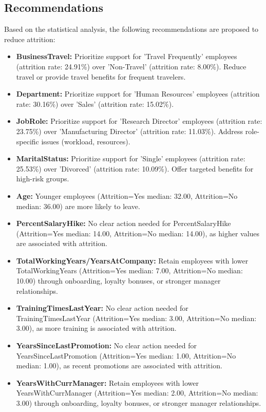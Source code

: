 \documentclass[12pt, a4paper]{article}
\begin{document}
\subsection{Recommendations}
Based on the statistical analysis, the following recommendations are proposed to reduce attrition:
\begin{itemize}
    \item \textbf{BusinessTravel:} Prioritize support for 'Travel Frequently' employees (attrition rate: 24.91\%) over 'Non-Travel' (attrition rate: 8.00\%). Reduce travel or provide travel benefits for frequent travelers.
    \item \textbf{Department:} Prioritize support for 'Human Resources' employees (attrition rate: 30.16\%) over 'Sales' (attrition rate: 15.02\%).
    \item \textbf{JobRole:} Prioritize support for 'Research Director' employees (attrition rate: 23.75\%) over 'Manufacturing Director' (attrition rate: 11.03\%). Address role-specific issues (workload, resources).
    \item \textbf{MaritalStatus:} Prioritize support for 'Single' employees (attrition rate: 25.53\%) over 'Divorced' (attrition rate: 10.09\%). Offer targeted benefits for high-risk groups.
    \item \textbf{Age:} Younger employees (Attrition=Yes median: 32.00, Attrition=No median: 36.00) are more likely to leave. 
    \item \textbf{PercentSalaryHike:} No clear action needed for PercentSalaryHike (Attrition=Yes median: 14.00, Attrition=No median: 14.00), as higher values are associated with attrition.
    \item \textbf{TotalWorkingYears/YearsAtCompany:} Retain employees with lower TotalWorkingYears (Attrition=Yes median: 7.00, Attrition=No median: 10.00) through onboarding, loyalty bonuses, or stronger manager relationships.
    \item \textbf{TrainingTimesLastYear:} No clear action needed for TrainingTimesLastYear (Attrition=Yes median: 3.00, Attrition=No median: 3.00), as more training is associated with attrition.
    \item \textbf{YearsSinceLastPromotion:} No clear action needed for YearsSinceLastPromotion (Attrition=Yes median: 1.00, Attrition=No median: 1.00), as recent promotions are associated with attrition.
    \item \textbf{YearsWithCurrManager:} Retain employees with lower YearsWithCurrManager (Attrition=Yes median: 2.00, Attrition=No median: 3.00) through onboarding, loyalty bonuses, or stronger manager relationships.
\end{itemize}
\end{document}
